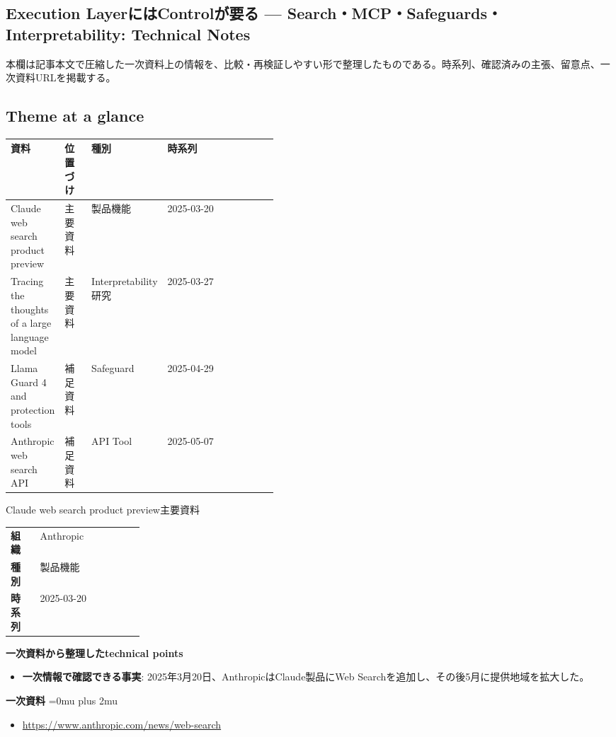 \subsection*{Execution LayerにはControlが要る — Search・MCP・Safeguards・Interpretability: Technical Notes}
本欄は記事本文で圧縮した一次資料上の情報を、比較・再検証しやすい形で整理したものである。時系列、確認済みの主張、留意点、一次資料URLを掲載する。
\medskip
\subsection*{Theme at a glance}
\begin{center}
\footnotesize
\begin{tabularx}{\linewidth}{@{}p{0.20\linewidth}p{0.10\linewidth}p{0.14\linewidth}X@{}}
\toprule
資料 & 位置づけ & 種別 & 時系列 \\
\midrule
Claude web search product preview & 主要資料 & 製品機能 & 2025-03-20 \\
Tracing the thoughts of a large language model & 主要資料 & Interpretability研究 & 2025-03-27 \\
Llama Guard 4 and protection tools & 補足資料 & Safeguard & 2025-04-29 \\
Anthropic web search API & 補足資料 & API Tool & 2025-05-07 \\
\bottomrule
\end{tabularx}
\end{center}
\normalsize

\begin{technicalnote}{Claude web search product preview}{主要資料}
\begingroup
\begin{tabularx}{\linewidth}{@{}>{\bfseries}p{0.22\linewidth}X@{}}
組織 & Anthropic \\
種別 & 製品機能 \\
時系列 & 2025-03-20 \\
\end{tabularx}
\smallskip
{\bfseries 一次資料から整理したtechnical points}
\begin{itemize}[leftmargin=1.5em,itemsep=0.35em]
\item \textbf{一次情報で確認できる事実}: 2025年3月20日、AnthropicはClaude製品にWeb Searchを追加し、その後5月に提供地域を拡大した。
\end{itemize}
\begin{samepage}
{\bfseries 一次資料}
\begingroup\sloppy
\Urlmuskip=0mu plus 2mu\relax
\begin{itemize}[leftmargin=1.5em,itemsep=0.25em]
\item {\scriptsize\url{https://www.anthropic.com/news/web-search}}
\end{itemize}
\endgroup
\end{samepage}
\endgroup
\end{technicalnote}
\medskip

